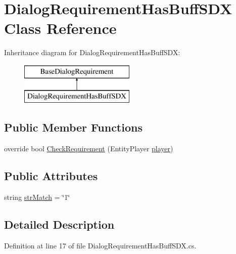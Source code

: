 \hypertarget{class_dialog_requirement_has_buff_s_d_x}{}\section{Dialog\+Requirement\+Has\+Buff\+S\+DX Class Reference}
\label{class_dialog_requirement_has_buff_s_d_x}
Inheritance diagram for Dialog\+Requirement\+Has\+Buff\+S\+DX\+:\begin{figure}[H]
\begin{center}
\leavevmode
\includegraphics[height=2.000000cm]{class_dialog_requirement_has_buff_s_d_x}
\end{center}
\end{figure}
\subsection*{Public Member Functions}
\begin{DoxyCompactItemize}
\item 
override bool \mbox{\hyperlink{class_dialog_requirement_has_buff_s_d_x_ac1b8f053e4c78283f56aa342360d48bc}{Check\+Requirement}} (Entity\+Player \mbox{\hyperlink{_sphere_i_i_01_music_01_boxes_2_config_2_localization_8txt_a4e2cb8aeff651600ea1cc57fe5a929a4}{player}})
\end{DoxyCompactItemize}
\subsection*{Public Attributes}
\begin{DoxyCompactItemize}
\item 
string \mbox{\hyperlink{class_dialog_requirement_has_buff_s_d_x_a38b5f555e5846a5d789ea75d71c1249e}{str\+Match}} = \char`\"{}1\char`\"{}
\end{DoxyCompactItemize}


\subsection{Detailed Description}


Definition at line 17 of file Dialog\+Requirement\+Has\+Buff\+S\+D\+X.\+cs.



